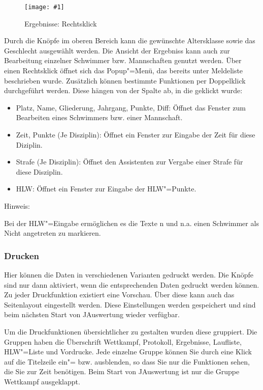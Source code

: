 \documentclass[11pt,a4paper,twoside,ngerman]{article}
\newcommand{\hsmimage}[3]{\begin{figure}[!ht]\centering\texttt{[image: \#1]}\caption{#3}\end{figure}}
\begin{document}
\hsmimage{pics/panel-ergebnisse-popup}{.19\textwidth}{Ergebnisse: Rechtsklick}
Durch die Knöpfe im oberen Bereich kann die gewünschte Altersklasse sowie das Geschlecht ausgewählt werden. Die Ansicht der Ergebniss kann auch zur Bearbeitung einzelner Schwimmer bzw. Mannschaften genutzt werden. Über einen Rechtsklick öffnet sich das Popup"=Menü, das bereits unter \glqq{}Meldeliste\grqq{} beschrieben wurde. Zusätzlich können bestimmte Funktionen per Doppelklick durchgeführt werden. Diese hängen von der Spalte ab, in die geklickt wurde:
\begin{itemize}

\item Platz, Name, Gliederung, Jahrgang, Punkte, Diff: Öffnet das Fenster zum Bearbeiten eines Schwimmers bzw. einer Mannschaft.


\item Zeit, Punkte (Je Disziplin): Öffnet ein Fenster zur Eingabe der Zeit für diese Diziplin.


\item Strafe (Je Disziplin): Öffnet den Assistenten zur Vergabe einer Strafe für diese Disziplin.


\item HLW: Öffnet ein Fenster zur Eingabe der HLW"=Punkte.


\end{itemize}


\begin{bfseries}Hinweis:\end{bfseries} Bei der HLW"=Eingabe ermöglichen es die Texte \glqq{}n\grqq{} und \glqq{}n.a.\grqq{} einen Schwimmer als \glqq{}Nicht angetreten\grqq{} zu markieren.


\subsubsection*{Drucken}
Hier können die Daten in verschiedenen Varianten gedruckt werden. Die Knöpfe sind nur dann aktiviert, wenn die entsprechenden Daten gedruckt werden können. Zu jeder Druckfunktion existiert eine Vorschau. Über diese kann auch das Seitenlayout eingestellt werden. Diese Einstellungen werden gespeichert und sind beim nächsten Start von JAuswertung wieder verfügbar.

Um die Druckfunktionen übersichtlicher zu gestalten wurden diese gruppiert. Die Gruppen haben die Überschrift \glqq{}Wettkampf\grqq{}, \glqq{}Protokoll\grqq{}, \glqq{}Ergebnisse\grqq{}, \glqq{}Laufliste\grqq{}, \glqq{}HLW"=Liste\grqq{} und \glqq{}Vordrucke\grqq{}. Jede einzelne Gruppe können Sie durch eine Klick auf die Titelzeile ein"= bzw. ausblenden, so dass Sie nur die Funktionen sehen, die Sie zur Zeit benötigen. Beim Start von JAuswertung ist nur die Gruppe \glqq{}Wettkampf\grqq{} ausgeklappt.
\end{document}
